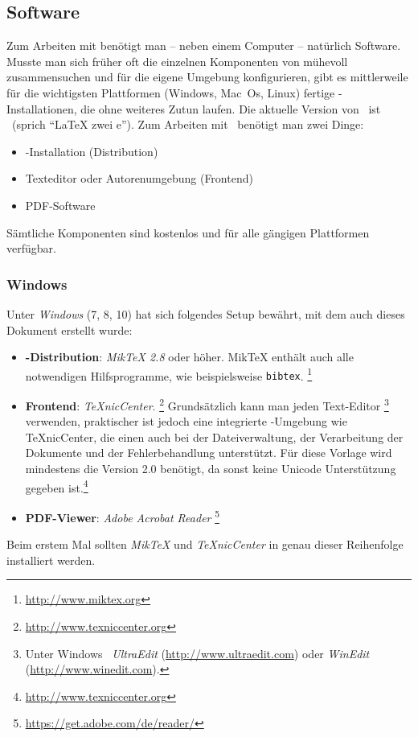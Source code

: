 \subsection{Software}

Zum Arbeiten mit \latex benötigt man -- neben einem Computer -- natürlich Software. Musste man sich früher oft die einzelnen Komponenten von \latex mühevoll zusammensuchen und für die eigene Umgebung konfigurieren, gibt es mittlerweile für die wichtigsten Plattformen (Windows, Mac~Os, Linux) fertige \latex-Installationen, die ohne weiteres Zutun laufen. Die aktuelle Version von \latex\ ist \LaTeXe\ (sprich "`LaTeX zwei e"'). 
Zum Arbeiten mit \latex\ benötigt man zwei Dinge:
%
\begin{itemize}
\item \latex-Installation (Distribution)
\item Texteditor oder Autorenumgebung (Frontend)
\item PDF-Software 
\end{itemize}
%
Sämtliche Komponenten sind kostenlos und für alle gängigen Plattformen verfügbar.


\subsubsection{Windows}

Unter \emph{Windows} (7, 8, 10) hat sich folgendes Setup bewährt,
mit dem \ua auch dieses Dokument erstellt wurde:
%
\begin{itemize}
\item \textbf{\latex-Distribution}: \emph{MikTeX 2.8} oder höher.
MikTeX enthält auch alle notwendigen Hilfsprogramme, wie beispielsweise {\tt bibtex}.%
\footnote{\url{http://www.miktex.org}}
\item \textbf{Frontend}: \emph{TeXnicCenter}.%
\footnote{\url{http://www.texniccenter.org}}
Grundsätzlich kann man jeden Text-Editor%
\footnote{Unter Windows \zB\ \emph{Ultra\-Edit} (\url{http://www.ultraedit.com})
oder \emph{WinEdit} (\url{http://www.winedit.com}).} verwenden, praktischer ist jedoch eine integrierte \latex-Umgebung wie TeXnicCenter, die einen auch bei 
der Dateiverwaltung, der Verarbeitung der Dokumente und der Fehlerbehandlung unterstützt. Für diese Vorlage wird mindestens die Version 2.0 benötigt, da sonst keine Unicode Unterstützung gegeben ist.\footnote{\url{http://www.texniccenter.org}}
\item \textbf{PDF-Viewer}: \emph{Adobe Acrobat Reader}%
\footnote{\url{https://get.adobe.com/de/reader/}}
\end{itemize}
Beim erstem Mal sollten \emph{MikTeX} und \emph{TeXnicCenter} in genau dieser Reihenfolge installiert werden.


